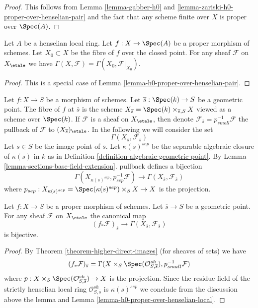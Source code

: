 \begin{proof}
This follows from Lemma \ref{lemma-gabber-h0} and
\ref{lemma-zariski-h0-proper-over-henselian-pair}
and the fact that any scheme finite over $X$ is proper over $\Spec(A)$.
\end{proof}

\begin{lemma}
\label{lemma-h0-proper-over-henselian-local}
Let $A$ be a henselian local ring. Let $f : X \to \Spec(A)$
be a proper morphism of schemes. Let $X_0 \subset X$ be the fibre of
$f$ over the closed point. For any sheaf $\mathcal{F}$ on $X_\etale$ we
have $\Gamma(X, \mathcal{F}) = \Gamma(X_0, \mathcal{F}|_{X_0})$.
\end{lemma}

\begin{proof}
This is a special case of Lemma \ref{lemma-h0-proper-over-henselian-pair}.
\end{proof}

\noindent
Let $f : X \to S$ be a morphism of schemes. Let
$\overline{s} : \Spec(k) \to S$ be a geometric point. The fibre
of $f$ at $\overline{s}$ is the scheme
$X_{\overline{s}} = \Spec(k) \times_{\overline{s}, S} X$ viewed
as a scheme over $\Spec(k)$. If $\mathcal{F}$ is a sheaf on
$X_\etale$, then denote
$\mathcal{F}_{\overline{s}} = p_{small}^{-1}\mathcal{F}$
the pullback of $\mathcal{F}$ to $(X_{\overline{s}})_\etale$.
In the following we will consider the set
$$
\Gamma(X_{\overline{s}}, \mathcal{F}_{\overline{s}})
$$
Let $s \in S$ be the image point of $\overline{s}$. Let $\kappa(s)^{sep}$
be the separable algebraic closure of $\kappa(s)$ in $k$ as in
Definition \ref{definition-algebraic-geometric-point}.
By Lemma \ref{lemma-sections-base-field-extension}.
pullback defines a bijection
$$
\Gamma(X_{\kappa(s)^{sep}},
p_{sep}^{-1} \mathcal{F})
\longrightarrow
\Gamma(X_{\overline{s}}, \mathcal{F}_{\overline{s}})
$$
where $p_{sep} : X_{\kappa(s)^{sep}} = \Spec(\kappa(s)^{sep}) \times_S X \to X$
is the projection.

\begin{lemma}
\label{lemma-proper-pushforward-stalk}
Let $f : X \to S$ be a proper morphism of schemes. Let
$\overline{s} \to S$ be a geometric point.
For any sheaf $\mathcal{F}$ on $X_\etale$
the canonical map
$$
(f_*\mathcal{F})_{\overline{s}} \longrightarrow
\Gamma(X_{\overline{s}}, \mathcal{F}_{\overline{s}})
$$
is bijective.
\end{lemma}

\begin{proof}
By Theorem \ref{theorem-higher-direct-images} (for sheaves of sets)
we have
$$
(f_*\mathcal{F})_{\overline{s}} =
\Gamma(X \times_S \Spec(\mathcal{O}_{S, \overline{s}}^{sh}),
p_{small}^{-1}\mathcal{F})
$$
where $p : X \times_S \Spec(\mathcal{O}_{S, \overline{s}}^{sh}) \to X$
is the projection. Since the residue field of the strictly henselian
local ring $\mathcal{O}_{S, \overline{s}}^{sh}$ is $\kappa(s)^{sep}$
we conclude from the discussion above the lemma and
Lemma \ref{lemma-h0-proper-over-henselian-local}.
\end{proof}

